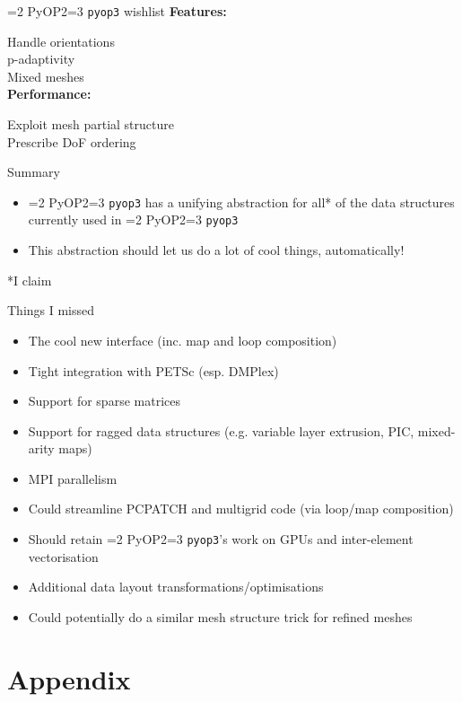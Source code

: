 \documentclass{beamer}
\newcommand{\checked}{\makebox[0pt][l]{$\square$}\raisebox{.15ex}{\hspace{0.1em}$\checkmark$}}
\def\pyop#1{\ifnum#1=2 {PyOP2}\else \ifnum#1=3 {\texttt{pyop3}}\fi \fi}
\begin{document}
\begin{frame}{\pyop3 wishlist}
  \textbf{Features:}

  \checked Handle orientations \\
  \checked p-adaptivity \\
  \checked Mixed meshes \\

  \textbf{Performance:}

  \checked Exploit mesh partial structure \\
  \checked Prescribe DoF ordering
\end{frame}

\begin{frame}{Summary}
  \begin{itemize}
    \item \pyop3 has a unifying abstraction for all* of the data structures currently used in \pyop2
    \item This abstraction should let us do a lot of cool things, automatically!
  \end{itemize}

  \vspace{2em}
  \small{*I claim}
\end{frame}

\begin{frame}{Things I missed}
  \small
  \begin{itemize}
    \item The cool new interface (inc. map and loop composition)
    \item Tight integration with PETSc (esp. DMPlex)
    \item Support for sparse matrices
    \item Support for ragged data structures (e.g. variable layer extrusion, PIC, mixed-arity maps)
    \item MPI parallelism
    \item Could streamline PCPATCH and multigrid code (via loop/map composition)
    \item Should retain \pyop2's work on GPUs and inter-element vectorisation
    \item Additional data layout transformations/optimisations
    \item Could potentially do a similar mesh structure trick for refined meshes
  \end{itemize}
\end{frame}

\section{Appendix}
\end{document}
